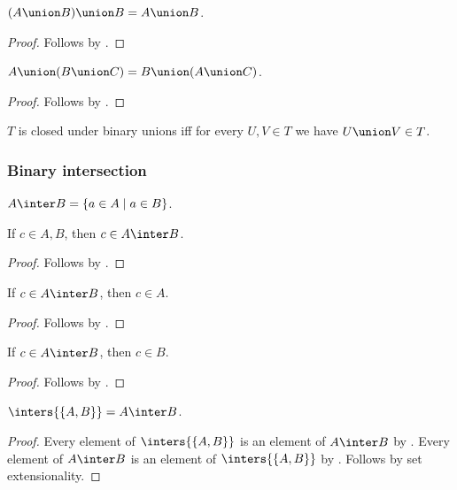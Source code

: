 \begin{proposition}\label{union_absorb_right}
    $(A\union B)\union B = A\union B$.
\end{proposition}
\begin{proof}
    Follows by .
\end{proof}

\begin{proposition}\label{union_comm_left}
    $A\union (B\union C) = B\union (A\union C)$.
\end{proposition}
\begin{proof}
    Follows by .
\end{proof}

\begin{abbreviation}\label{closedunderunion}
    $T$ is closed under binary unions
    iff for every $U,V\in T$ we have $U\union V\in T$.
\end{abbreviation}


\subsubsection{Binary intersection}

\begin{definition}\label{inter}
    $A\inter B = \{ a \in A \mid a\in B\}$.
\end{definition}

\begin{proposition}\label{inter_intro}
    If $c\in A, B$, then $c\in A\inter B$.
\end{proposition}
\begin{proof}
    Follows by .
\end{proof}

\begin{proposition}\label{inter_elim_left}
    If $c\in A\inter B$, then $c\in A$.
\end{proposition}
\begin{proof}
    Follows by .
\end{proof}

\begin{proposition}\label{inter_elim_right}
    If $c\in A\inter B$, then $c\in B$.
\end{proposition}
\begin{proof}
    Follows by .
\end{proof}

\begin{proposition}\label{inter_as_inters}
    $\inters{\{A,B\}} = A\inter B$.
\end{proposition}
\begin{proof}
    Every element of $\inters{\{A,B\}}$ is an element of $A\inter B$
        by .
    Every element of $A\inter B$ is an element of $\inters{\{A,B\}}$
        by .
    Follows by set extensionality.
\end{proof}



